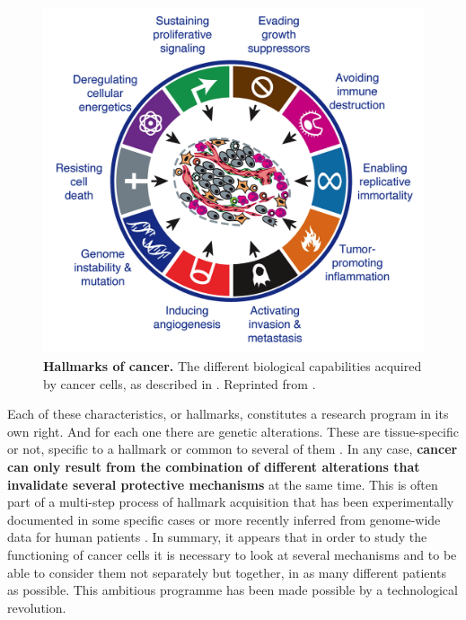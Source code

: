 \documentclass[a4paper,12pt,twoside,onecolumn,openright,final,oldfontcommands]{memoir}
\begin{document}
\begin{figure}

{\centering \includegraphics[width=0.9\linewidth]{fig/hallmarks} 

}

\caption[Hallmarks of cancer]{\textbf{Hallmarks of cancer.} The different
biological capabilities acquired by cancer cells, as described in
\citet{hanahan2000hallmarks}. Reprinted from
\citet{hanahan2011hallmarks}.}\label{fig:hallmarks}
\end{figure}






Each of these characteristics, or hallmarks, constitutes a research
program in its own right. And for each one there are genetic
alterations. These are tissue-specific or not, specific to a hallmark or
common to several of them \citep{hanahan2000hallmarks}. In any case,
\textbf{cancer can only result from the combination of different
alterations that invalidate several protective mechanisms} at the same
time. This is often part of a multi-step process of hallmark acquisition
that has been experimentally documented in some specific cases
\citep{hahn1999creation} or more recently inferred from genome-wide data
for human patients \citep{tomasetti2015only}. In summary, it appears
that in order to study the functioning of cancer cells it is necessary
to look at several mechanisms and to be able to consider them not
separately but together, in as many different patients as possible. This
ambitious programme has been made possible by a technological
revolution.
\end{document}
